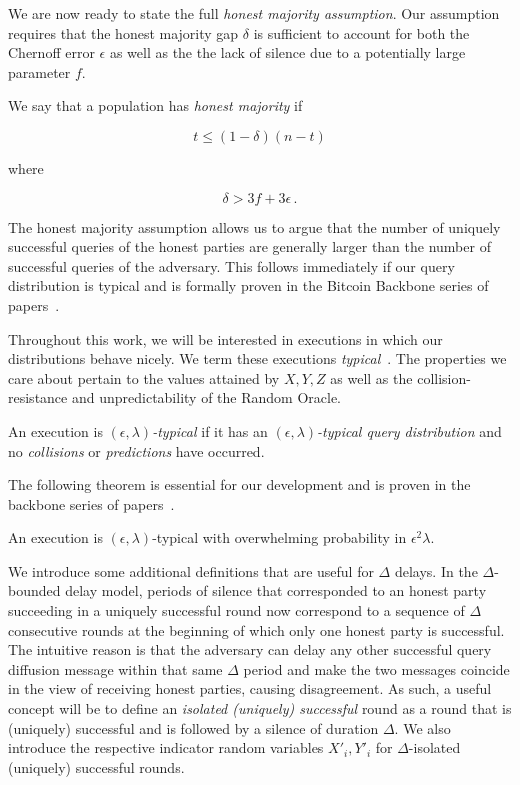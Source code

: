 We are now ready to state the full \emph{honest majority assumption}. Our
assumption requires that the honest majority gap $\delta$ is sufficient to
account for both the Chernoff error $\epsilon$ as well as the the lack of
silence due to a potentially large parameter $f$.

\begin{definition}
  We say that a population has \emph{honest majority} if

  \[
  t \leq (1 - \delta)(n - t)
  \]

  where

  \[
  \delta > 3f + 3\epsilon\,.
  \]
\end{definition}

The honest majority assumption allows us to argue that the number of uniquely
successful queries of the honest parties are generally larger than the number of
successful queries of the adversary. This follows immediately if our query
distribution is typical and is formally proven in the Bitcoin Backbone series of
papers~\cite{backbone,varbackbone}.

Throughout this work, we will be interested in executions in which our
distributions behave nicely. We term these executions
\emph{typical}~\cite{backbone}. The properties we care about pertain to the
values attained by $X, Y, Z$ as well as the collision-resistance and
unpredictability of the Random Oracle.

\begin{definition}
  An execution is \emph{$(\epsilon, \lambda)$-typical} if it has an
  \emph{$(\epsilon, \lambda)$-typical query distribution} and no
  \emph{collisions} or \emph{predictions} have occurred.
\end{definition}

The following theorem is essential for our development and is proven in the
backbone series of papers~\cite{backbone,varbackbone}.

\begin{theorem}[Typicality]
  An execution is $(\epsilon, \lambda)$-typical with overwhelming probability
  in $\epsilon^2 \lambda$.
\end{theorem}

We introduce some additional definitions that are useful for $\Delta$ delays.
In the $\Delta$-bounded delay model, periods of silence that corresponded to
an honest party succeeding in a uniquely successful round now correspond to a
sequence of $\Delta$ consecutive rounds at the beginning of which only one
honest party is successful. The intuitive reason is that the adversary can delay
any other successful query diffusion message within that same $\Delta$ period
and make the two messages coincide in the view of receiving honest parties,
causing disagreement. As such, a useful concept will be to define an
\emph{isolated (uniquely) successful} round as a round that is (uniquely)
successful and is followed by a silence of duration $\Delta$. We also introduce
the respective indicator random variables $X'_i, Y'_i$ for $\Delta$-isolated
(uniquely) successful rounds.

